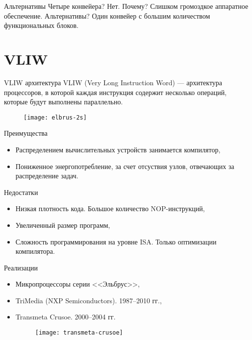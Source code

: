 \begin{frame}{Альтернативы}
Четыре конвейера?
\vfill\pause
Нет. Почему?
\vfill\pause
Слишком громоздкое аппаратное обеспечение. Альтернативы?
\vfill\pause
Один конвейер с большим количеством функциональных блоков.
\end{frame}

\section{VLIW}

\begin{frame}{VLIW архитектура}
VLIW (Very Long Instruction Word) --- архитектура процессоров, в которой каждая
инструкция содержит несколько операций, которые будут выполнены параллельно.

\begin{figure}[htpb]
    \texttt{[image: elbrus-2s]}
\end{figure}
\end{frame}

\begin{frame}{Преимущества}
\begin{itemize}
    \item Распределением вычислительных устройств занимается компилятор,
    \item Пониженное энергопотребление, за счет отсуствия узлов, отвечающих за
    распределение задач.
\end{itemize}
\end{frame}

\begin{frame}{Недостатки}
\begin{itemize}
    \item Низкая плотность кода. Большое количество NOP-инструкций,
    \item Увеличенный размер программ,
    \item Сложность программирования на уровне ISA. Только оптимизации
    компилятора.
\end{itemize}
\end{frame}

\begin{frame}{Реализации}
\begin{itemize}
    \item Микропроцессоры серии <<Эльбрус>>,
    \item TriMedia (NXP Semiconductors). 1987--2010 гг.,
    \item Transmeta Crusoe. 2000--2004 гг.
    \begin{figure}[htbp]
        \texttt{[image: transmeta-crusoe]}
    \end{figure}
\end{itemize}
\end{frame}

